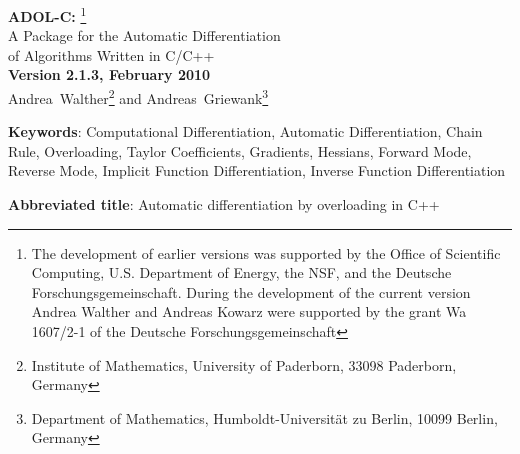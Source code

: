 \documentclass[11pt,twoside]{article}
\begin{document}
\begin{titlepage}
\begin{center}
{\Large {\bf ADOL-C:}} 
\footnote{The development of earlier versions was supported by the Office of
  Scientific Computing, U.S. Department of Energy, the NSF, and the Deutsche
  Forschungsgemeinschaft. During the development of the current
  version Andrea Walther and Andreas Kowarz were supported by the
  grant Wa 1607/2-1 of the Deutsche Forschungsgemeinschaft}  
\vspace{0.2in} \\
%
{\Large A Package for the Automatic Differentiation}\vspace{0.1in} \\
{\Large of Algorithms Written in C/C++}\\
\vspace{.2in}
{\large\bf  Version 2.1.3, February 2010} \\
\bigskip
 \mbox{Andrea Walther}\footnote{Institute of Mathematics, University
   of Paderborn, 33098 Paderborn, Germany} and
 \mbox{Andreas Griewank}\footnote{Department of Mathematics,
 Humboldt-Universit\"at zu Berlin, 10099 Berlin, Germany}
\end{center}
%
\begin{abstract}
The C++ package ADOL-C described here facilitates the evaluation of
first and higher derivatives of vector functions that are defined
by computer programs written in C or C++. The resulting derivative
evaluation routines may be called from C, C++, Fortran, or any other
language that can be linked with C.

The numerical values of derivative vectors are obtained free
of truncation errors at a small multiple of the run time and
random access memory required by the given function evaluation program.
Derivative matrices are obtained by columns, by rows or in sparse format. 
For solution curves defined by ordinary differential equations,
special routines are provided that evaluate the Taylor coefficient vectors
and their Jacobians with respect to the current state vector.
For explicitly or implicitly defined functions derivative tensors are 
obtained with a complexity that grows only quadratically in their
degree. The derivative calculations involve a possibly substantial but
always predictable amount of data. Since the data is accessed strictly sequentially 
it can be automatically paged out to external files. 
\end{abstract}
%
{\bf Keywords}: Computational Differentiation, Automatic 
         Differentiation,
         Chain Rule, Overloading, Taylor Coefficients, 
         Gradients, Hessians, Forward Mode, Reverse Mode,
         Implicit Function Differentiation, Inverse Function Differentiation 
\medskip

\noindent
{\bf Abbreviated title}: Automatic differentiation by overloading in C++
%
\end{titlepage}
%
\tableofcontents       
%
\end{document}

